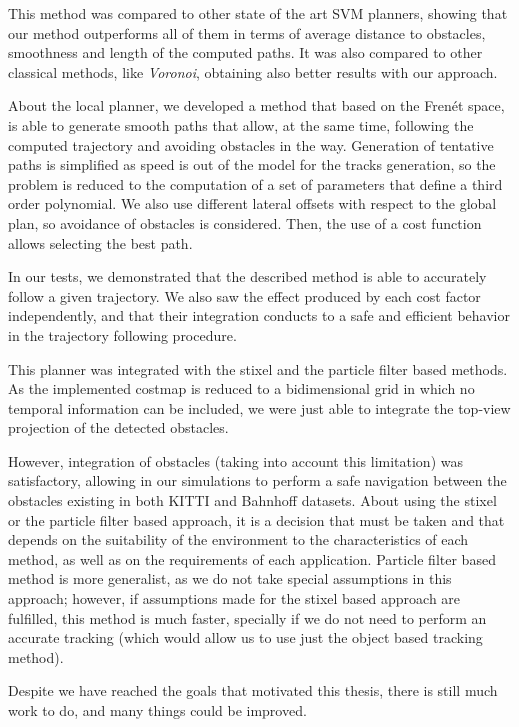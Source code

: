 This method was compared to other state of the art \ac{SVM} planners, showing that our method outperforms all of them in terms of average distance to obstacles, smoothness and length of the computed paths. It was also compared to other classical methods, like \emph{Voronoi}, obtaining also better results with our approach.

About the local planner, we developed a method that based on the Frenét space, is able to generate smooth paths that allow, at the same time, following the computed trajectory and avoiding obstacles in the way. Generation of tentative paths is simplified as speed is out of the model for the tracks generation, so the problem is reduced to the computation of a set of parameters that define a third order polynomial. We also use different lateral offsets with respect to the global plan, so avoidance of obstacles is considered. Then, the use of a cost function allows selecting the best path.

In our tests, we demonstrated that the described method is able to accurately follow a given trajectory. We also saw the effect produced by each cost factor independently, and that their integration conducts to a safe and efficient behavior in the trajectory following procedure.

This planner was integrated with the stixel and the particle filter based methods. As the implemented costmap is reduced to a bidimensional grid in which no temporal information can be included, we were just able to integrate the top-view projection of the detected obstacles.

However, integration of obstacles (taking into account this limitation) was satisfactory, allowing in our simulations to perform a safe navigation between the obstacles existing in both KITTI \citep{geiger2013vision} and Bahnhoff \citep{ess2009robust} datasets. About using the stixel or the particle filter based approach, it is a decision that must be taken and that depends on the suitability of the environment to the characteristics of each method, as well as on the requirements of each application. Particle filter based method is more generalist, as we do not take special assumptions in this approach; however, if assumptions made for the stixel based approach are fulfilled, this method is much faster, specially if we do not need to perform an accurate tracking (which would allow us to use just the object based tracking method).


Despite we have reached the goals that motivated this thesis, there is still much work to do, and many things could be improved. 

